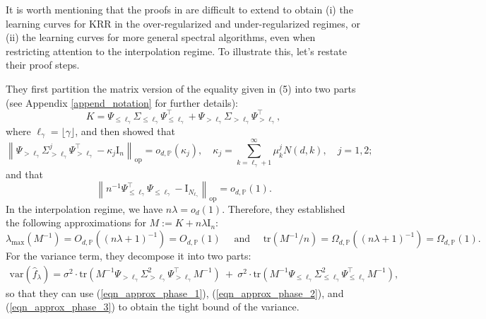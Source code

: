 \documentclass{article}
\theoremstyle{plain}
\theoremstyle{definition}
\theoremstyle{remark}
\newcommand{\green}{\color{green}}
\begin{document}
\begin{appendix}
It is worth mentioning that the proofs in \cite{zhang2024phase} are difficult to extend to obtain (i) the learning curves for KRR in the over-regularized and under-regularized regimes, or (ii) the learning curves for more general spectral algorithms, even when restricting attention to the interpolation regime. 
To illustrate this, let's restate their proof steps.

They first partition the matrix version of the equality given in (5) into two parts (see Appendix \ref{append_notation} for further details):
$$
K = \Psi_{\leq \ell_{\gamma}} \Sigma_{\leq \ell_{\gamma}} \Psi_{\leq \ell_{\gamma}}^{\top} + \Psi_{>\ell_{\gamma}} \Sigma_{>\ell_{\gamma}} \Psi_{>\ell_{\gamma}}^{\top},
$$
where $\ell_{\gamma} = \lfloor \gamma \rfloor$, and then showed that
\begin{equation}\label{eqn_approx_phase_1}
    \left\|\Psi_{>\ell_{\gamma}} \Sigma_{>\ell_{\gamma}}^j \Psi_{>\ell_{\gamma}}^{\top} - \kappa_j\mathrm{I}_n \right\|_{\mathrm{op}} = o_{d, \mathbb{P}}(\kappa_j), \quad \kappa_j = \sum_{k=\ell_{\gamma}+1}^\infty \mu_k^j N(d, k),\quad j=1,2;
\end{equation}
and that
\begin{equation}\label{eqn_approx_phase_2}
\left\| n^{-1}{\Psi_{\leq \ell_{\gamma}}^{\top} \Psi_{\leq \ell_{\gamma}} } - \mathrm{I}_{N_{\ell_{\gamma}}} \right\|_{\mathrm{op}} = o_{d, \mathbb{P}}(1).
\end{equation}
In the interpolation regime, we have $n\lambda =o_d(1)$. Therefore, they established the following approximations for $M:= K+n\lambda \mathrm{I}_n$:
\begin{equation}\label{eqn_approx_phase_3}
\lambda_{\text{max}}\left( M^{-1}\right) = O_{d, \mathbb{P}}((n\lambda+1)^{-1}) = O_{d, \mathbb{P}}(1) \quad \text{ and } \quad
\mathrm{tr}\left( M^{-1} / n\right)=\Omega_{d, \mathbb{P}}((n\lambda+1)^{-1}) = \Omega_{d, \mathbb{P}}(1).
\end{equation}
For the variance term, they decompose it into two parts:
    \begin{equation}
\label{eq var tr}
    \begin{aligned}
        \mathrm{var}\left( \hat{f}_{\lambda} \right) 
    =  
    \sigma^{2} \cdot \mathrm{tr} \left( M^{-1} \Psi_{>\ell_{\gamma}} \Sigma_{>\ell_{\gamma}}^2 \Psi_{>\ell_{\gamma}}^{\top} M^{-1}\right)  ~+~ \sigma^{2} \cdot \mathrm{tr} \left( M^{-1} \Psi_{\leq \ell_{\gamma}} \Sigma_{\leq \ell_{\gamma}}^{2} \Psi_{\leq \ell_{\gamma}}^{\top} M^{-1}\right),
    \end{aligned}
\end{equation}
so that they can use (\ref{eqn_approx_phase_1}), (\ref{eqn_approx_phase_2}), and (\ref{eqn_approx_phase_3}) to obtain the tight bound of the variance.


\end{appendix}
\end{document}
